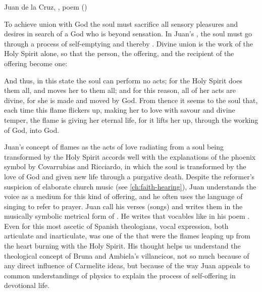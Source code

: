 {Juan de la Cruz, , poem ()}

To achieve union with God the soul must sacrifice all sensory pleasures and
desires in search of a God who is beyond sensation.
In Juan's , the soul must go through a process
of self-emptying and thereby .%
    \autocite[191]{JuandelaCruz:Subida}
Divine union is the work of the Holy Spirit alone, so that the person, the
offering, and the recipient of the offering become one:
\begin{quoting}
    And thus, in this state the soul can perform no acts; for the Holy Spirit
    does them all, and moves her to them all; and for this reason, all of her acts
    are divine, for she is made and moved by God.  
    From thence it seems to the soul that, each time this flame flickers up,
    making her to love with savour and divine temper, the flame is giving her
    eternal life, for it lifts her up, through the working of God, into God.%
    	\Autocite[791]{JuandelaCruz:Llama} 
\end{quoting}

Juan's concept of flames as the acts of love radiating from a soul being
transformed by the Holy Spirit accords well with the explanations of the
phoenix symbol by Covarrubias and Ricciardo, in which the soul is transformed by
the love of God and given new life through a purgative death.
Despite the reformer's suspicion of elaborate church music (see
\cref{ch:faith-hearing}), Juan understands the voice as a medium for this kind
of offering, and he often uses the language of singing to refer to prayer.
Juan call his verses  (songs) and writes them in the
musically symbolic metrical form of . 
He writes that vocables like  in his poem .%
    \Autocite[790]{JuandelaCruz:Llama} 
Even for this most ascetic of Spanish theologians, vocal expression, both
articulate and inarticulate, was one of the  that were the
flames leaping up from the heart burning with the Holy Spirit.
His thought helps us understand the theological concept of Bruna and Ambiela's
villancicos, not so much because of any direct influence of Carmelite ideas,
but because of the way Juan appeals to common understandings of physics to
explain the process of self-offering in devotional life. 

